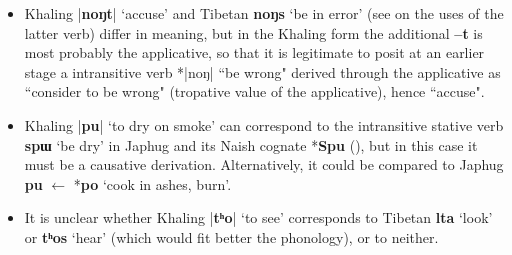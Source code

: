 \documentclass[oldfontcommands,oneside,a4paper,11pt]{article}
\newcommand{\ipa}[1]{{\phon\textbf{#1}}}
\newcommand{\forme}[2]{\ipa{#1} `#2'}
\newcommand{\dhatu}[2]{|\ipa{#1}| `#2'}
\begin{document}
\begin{itemize}
\item Khaling \dhatu{noŋt}{accuse} and Tibetan \forme{noŋs}{be in error} (see \citealt{hill08moriendi} on the uses of the latter verb) differ in meaning, but in the Khaling form the additional \ipa{--t} is most probably the applicative, so that it is legitimate to posit at an earlier stage a intransitive verb *|noŋ| ``be wrong" derived through the applicative as ``consider to be wrong" (tropative value of the applicative), hence ``accuse".
\item Khaling \dhatu{pu}{to dry on smoke} can correspond to the intransitive stative verb \forme{spɯ}{be dry} in Japhug and its Naish cognate *\ipa{Spu} (\citealt{jacques.michaud11naish}), but in this case it must be a causative derivation. 
Alternatively, it could be compared to Japhug \ipa{pu} $\leftarrow$ *\ipa{po}  `cook in ashes, burn'.
\item It is unclear whether Khaling \dhatu{tʰo}{to see} corresponds to Tibetan \forme{lta}{look} or \forme{tʰos}{hear} (which would fit better the phonology), or to neither.
\end{itemize}
\end{document}
